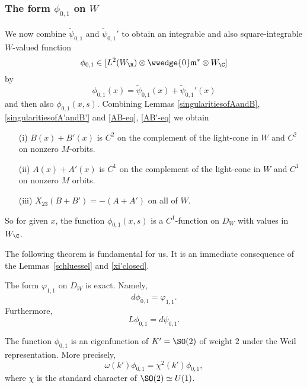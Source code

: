 

\subsubsection{The form $\phi_{0,1}$ on $W$}


We now combine $\tilde{\psi}_{0,1}$ and $\tilde{\psi}_{0,1}'$ to
obtain an integrable and also square-integrable $W$-valued function
\[
\phi_{0,1}  \in [L^2(W_{\R}) \otimes \wwedge{0} \mathfrak{m}^{\ast} \otimes W_{\C}]
\]
by
\begin{equation*}
\phi_{0,1}(x) = \tilde{\psi}_{0,1}(x) + \tilde{\psi}_{0,1}'(x)
\end{equation*}
and then also $\phi_{0,1}(x,s)$. Combining Lemmas
\ref{singularitiesofAandB}, \ref{singularitiesofA'andB'} and
\eqref{AB-eq}, \eqref{AB'-eq} we obtain

\begin{proposition}\label{phi-prop}
\begin{itemize}
\item[(i)] $B(x) + B'(x)$ is $C^2$ on the complement of the light-cone in $W$ and  $C^2$ on nonzero $M$-orbits.
\item[(ii)] $A(x) + A'(x)$ is $C^1$ on the complement of the light-cone in $W$ and  $C^1$ on nonzero $M$ orbits.
\item[(iii)] $X_{23}(B + B') = -(A + A')$ on all of $W$.
\end{itemize}
So for given $x$, the function $\phi_{0,1}(x,s)$ is a $C^1$-function on $D_W$ with values in $W_{\C}$.
\end{proposition}


The following theorem is fundamental for us. It is an immediate
consequence of the Lemmas~\ref{schluessel} and \ref{xi'closed}.

\begin{theorem}\label{local-phi}
The form $\varphi_{1,1}$ on $D_W$ is exact. Namely,
\[
d \phi_{0,1} = \varphi_{1,1}.
\]
Furthermore,
\[
L \phi_{0,1} = d \psi_{0,1}.
\]
\end{theorem}

The function $\phi_{0,1}$ is an eigenfunction of $K'=\SO(2)$ of weight $2$ under the Weil representation. More precisely,
\[
\omega(k') \phi_{0,1} =  \chi^2(k')\phi_{0,1},
\]
where $\chi$ is the standard character of $\SO(2) \simeq U(1)$.
\vskip 0.2in

